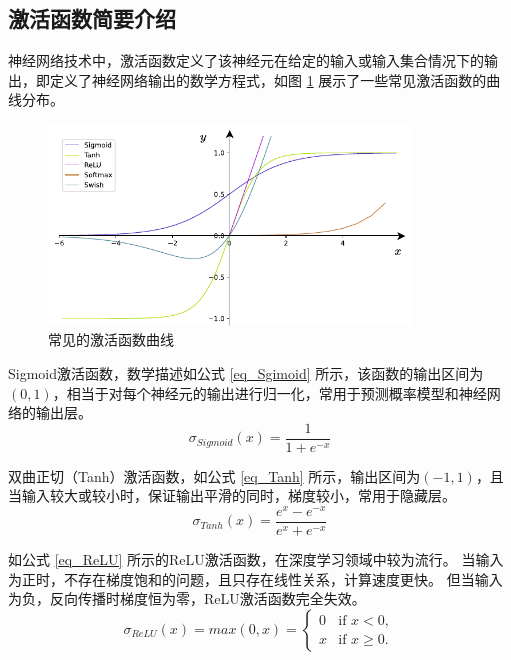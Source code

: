 \documentclass{xdupgthesis}
\begin{document}
\subsection{激活函数简要介绍}
神经网络技术中，激活函数定义了该神经元在给定的输入或输入集合情况下的输出，即定义了神经网络输出的数学方程式，如图 \ref{fig_Delta} 展示了一些常见激活函数的曲线分布。

\begin{figure}[ht]
    \centering
    \includegraphics[width=0.86\textwidth]{delta.pdf}
    \caption{常见的激活函数曲线}
    \label{fig_Delta}
\end{figure}

Sigmoid激活函数，数学描述如公式 \eqref{eq_Sgimoid} 所示，该函数的输出区间为$(0, 1)$，相当于对每个神经元的输出进行归一化，常用于预测概率模型和神经网络的输出层。
\begin{equation}
    \sigma_{Sigmoid}\left( x \right) = \frac{1}{1+e^{-x}}
    \label{eq_Sgimoid}
\end{equation}

双曲正切（Tanh）激活函数，如公式 \eqref{eq_Tanh} 所示，输出区间为$(-1, 1)$，且当输入较大或较小时，保证输出平滑的同时，梯度较小，常用于隐藏层。
\begin{equation}
    \sigma_{Tanh}\left( x \right) = \frac{e^{x}-e^{-x}}{e^{x}+e^{-x}}
    \label{eq_Tanh}
\end{equation}

如公式 \eqref{eq_ReLU} 所示的ReLU激活函数，在深度学习领域中较为流行。
当输入为正时，不存在梯度饱和的问题，且只存在线性关系，计算速度更快。
但当输入为负，反向传播时梯度恒为零，ReLU激活函数完全失效。
\begin{equation}
    \sigma_{ReLU}\left( x \right) = 
        max(0, x) = 
            \begin{cases}
                0 & \text{if } x < 0,\\
                x & \text{if } x \ge 0.
            \end{cases}
    \label{eq_ReLU}
\end{equation}
\end{document}
